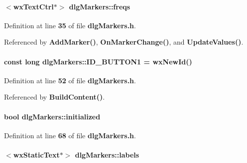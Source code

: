 \paragraph[{freqs}]{$<$wx\+Text\+Ctrl$\ast$$>$ dlg\+Markers\+::freqs}\label{classdlgMarkers_a2a550e1f47f0f822e50728c3ca2571f8}


Definition at line {\bf 35} of file {\bf dlg\+Markers.\+h}.



Referenced by {\bf Add\+Marker()}, {\bf On\+Marker\+Change()}, and {\bf Update\+Values()}.

\paragraph[{I\+D\+\_\+\+B\+U\+T\+T\+O\+N1}]{\setlength{\rightskip}{0pt plus 5cm}const long dlg\+Markers\+::\+I\+D\+\_\+\+B\+U\+T\+T\+O\+N1 = wx\+New\+Id()\hspace{0.3cm}{\ttfamily [static]}}\label{classdlgMarkers_a97b34ed6de93805fbb01778112d01964}


Definition at line {\bf 52} of file {\bf dlg\+Markers.\+h}.



Referenced by {\bf Build\+Content()}.

\paragraph[{initialized}]{\setlength{\rightskip}{0pt plus 5cm}bool dlg\+Markers\+::initialized\hspace{0.3cm}{\ttfamily [protected]}}\label{classdlgMarkers_ad3d206f687b3c93a7bf2f44aa84f5841}


Definition at line {\bf 68} of file {\bf dlg\+Markers.\+h}.

\paragraph[{labels}]{$<$wx\+Static\+Text$\ast$$>$ dlg\+Markers\+::labels}\label{classdlgMarkers_ad689396e78cfd5b66eb958de4601b9d1}


